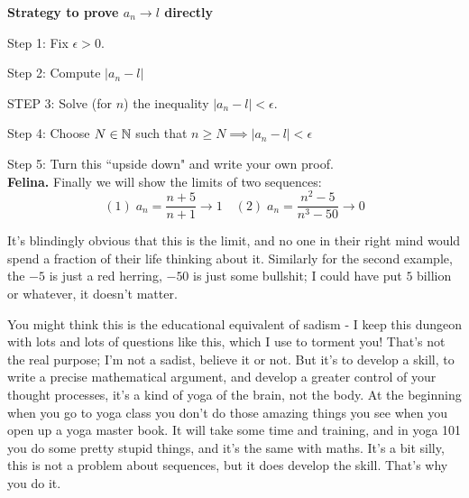 \documentclass[10pt]{scrartcl}
\begin{document}
\textbf{Strategy to prove $a_n \to l$ directly}

Step 1: Fix $\epsilon >0$. 

Step 2: Compute $|a_n - l|$

STEP 3: Solve (for $n$) the inequality $|a_n - l| < \epsilon$. 

Step 4: Choose $N \in\mathbb{N}$ such that $n \geq N \implies |a_n - l| < \epsilon$	

Step 5: Turn this ``upside down" and write your own proof.\\

\textbf{Felina.} Finally we will show the limits of two sequences: 
\[(1)\; a_n= \dfrac{n+5}{n+1} \to 1 \quad (2)\; a_n = \dfrac{n^2 - 5}{n^3-50} \to 0\]

It's blindingly obvious that this is the limit, and no one in their right mind would spend a fraction of their life thinking about it.	Similarly for the second example, the $-5$ is just a red herring, $-50$ is just some bullshit; I could have put $5$ billion or whatever, it doesn't matter.

 You might think this is the educational equivalent of sadism - I keep this dungeon with lots and lots of questions like this, which I use to torment you! That's not the real purpose; I'm not a sadist, believe it or not. But it's to develop a skill, to write a precise mathematical argument, and develop a greater control of your thought processes, it's a kind of yoga of the brain, not the body. At the beginning when you go to yoga class you don't do those amazing things you see when you open up a yoga master book. It will take some time and training, and in yoga 101 you do some pretty stupid things, and it's the same with maths. It's a bit silly, this is  not a problem about sequences, but it does develop the skill. That's why you do it.\\
\end{document}
